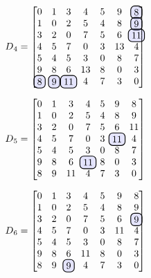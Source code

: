 \documentclass[devoir3.tex]{subfiles}
\begin{document}
\begin{align*}
	D\textsubscript{4} =
	\begin{bmatrix}
		0 		& 1 	  	& 3 		& 4 	  	  & 5		& 9	 	& \hlight{8} \\
		1 		& 0 		& 2		& 5		  & 4		& 8	 	& \hlight{9}  \\	
		3	 	& 2 		& 0 		& 7	 	  & 5 	  	& 6 		& \hlight{11} \\
		4 		& 5		& 7	  	& 0 	  	  & 3	  	& 13		& 4 \\
		5  		& 4 	 	& 5 		& 3 	  	  & 0 	  	& 8 	 	& 7  \\
		9	 	& 8	 	& 6		& 13		  & 8 	  	& 0 	 	& 3   \\
		\hlight{8} 	& \hlight{9} 	& \hlight{11}	& 4 	  	  & 7 	  	& 3 	 	& 0
	\end{bmatrix}
\end{align*}

\begin{align*}
	D\textsubscript{5} =
	\begin{bmatrix}
		0 		& 1 	  	& 3 		& 4 	  	  & 5		& 9	 	& 8 \\
		1 		& 0 		& 2		& 5		  & 4		& 8	 	& 9  \\	
		3	 	& 2 		& 0 		& 7	 	  & 5 	  	& 6 		& 11 \\
		4 		& 5		& 7	  	& 0 	  	  & 3	  	& \hlight{11}	& 4 \\
		5  		& 4 	 	& 5 		& 3 	  	  & 0 	  	& 8 	 	& 7  \\
		9	 	& 8	 	& 6		& \hlight{11}	  & 8 	  	& 0 	 	& 3   \\
		8 		& 9 		& 11		& 4 	  	  & 7 	  	& 3 	 	& 0
	\end{bmatrix}
\end{align*}

\begin{align*}
	D\textsubscript{6} =
	\begin{bmatrix}
		0 		& 1 	  	& 3 		& 4 	  	  & 5		& 9	 	& 8 \\
		1 		& 0 		& 2		& 5		  & 4		& 8	 	& 9  \\	
		3	 	& 2 		& 0 		& 7	 	  & 5 	  	& 6 		& \hlight{9} \\
		4 		& 5		& 7	  	& 0 	  	  & 3	  	& 11		& 4 \\
		5  		& 4 	 	& 5 		& 3 	  	  & 0 	  	& 8 	 	& 7  \\
		9	 	& 8	 	& 6		& 11		  & 8 	  	& 0 	 	& 3   \\
		8 		& 9 		& \hlight{9}	& 4 	  	  & 7 	  	& 3 	 	& 0
	\end{bmatrix}
\end{align*}
\end{document}
